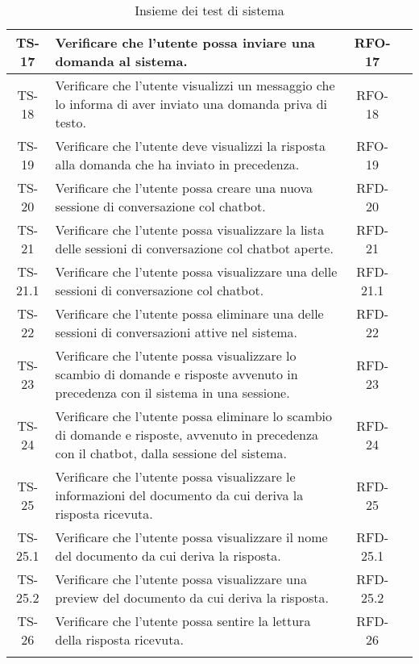 \begin{xltabular}{\textwidth}{| c | X | c | c |}
    \hline
    TS-17 &  Verificare che l'utente possa inviare una domanda al sistema. & RFO-17 & \textcolor{xmarkcolor}{} \\
    \hline
    TS-18 & Verificare che l'utente visualizzi un messaggio che lo informa di aver inviato una domanda priva di testo. & RFO-18 & \textcolor{xmarkcolor}{} \\
    \hline
    TS-19 & Verificare che l’utente deve visualizzi la risposta alla domanda che ha inviato in precedenza. & RFO-19 & \textcolor{xmarkcolor}{} \\
    \hline
    TS-20 & Verificare che l'utente possa creare una nuova sessione di conversazione col chatbot. & RFD-20 & \textcolor{xmarkcolor}{} \\
    \hline
    TS-21 & Verificare che l'utente possa visualizzare la lista delle sessioni di conversazione col chatbot aperte. & RFD-21 & \textcolor{xmarkcolor}{} \\
    \hline
    TS-21.1 & Verificare che l'utente possa visualizzare una delle sessioni di conversazione col chatbot. & RFD-21.1 & \textcolor{xmarkcolor}{} \\
    \hline
    TS-22 & Verificare che l'utente possa eliminare una delle sessioni di conversazioni attive nel sistema. & RFD-22 & \textcolor{xmarkcolor}{} \\
    \hline
    TS-23 & Verificare che l'utente possa visualizzare lo scambio di domande e risposte avvenuto in precedenza con il sistema in una sessione. & RFD-23 & \textcolor{xmarkcolor}{} \\
    \hline
    TS-24 & Verificare che l'utente possa eliminare lo scambio di domande e risposte, avvenuto in precedenza con il chatbot, dalla sessione del sistema. & RFD-24 & \textcolor{xmarkcolor}{} \\
    \hline
    TS-25 & Verificare che l'utente possa visualizzare le informazioni del documento da cui deriva la risposta ricevuta. & RFD-25 & \textcolor{xmarkcolor}{} \\
    \hline
    TS-25.1 & Verificare che l'utente possa visualizzare il nome del documento da cui deriva la risposta. & RFD-25.1 & \textcolor{xmarkcolor}{} \\
    \hline
    TS-25.2 & Verificare che l'utente possa visualizzare una preview del documento da cui deriva la risposta. & RFD-25.2 & \textcolor{xmarkcolor}{} \\
    \hline
    TS-26 & Verificare che l'utente possa sentire la lettura della risposta ricevuta. & RFD-26 & \textcolor{xmarkcolor}{} \\
    \hline
     \caption{Insieme dei test di sistema}
    \label{tab:test}
\end{xltabular}
\endgroup
